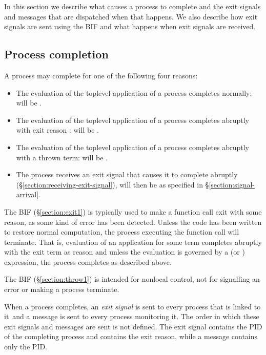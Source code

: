 In this section we describe what causes a process to complete and the exit signals and
messages that are dispatched when that happens.  We also describe how exit signals are
sent using the BIF  and what happens when exit signals are received.

\subsection{Process completion}

\label{section:process-completion}

A process may complete for one of the following four reasons:
\begin{itemize}
\item The evaluation of the toplevel application of a process completes normally:
 will be .
\item The evaluation of the toplevel application of a process completes abruptly
with exit reason :  will be .
\item The evaluation of the toplevel application of a process completes abruptly
with a thrown term:  will be .
\item The process receives an exit signal that causes it to complete abruptly
(\S\ref{section:receiving-exit-signal}),
 will then be as specified in \S\ref{section:signal-arrival}.
\end{itemize}

The BIF  (\S\ref{section:exit1}) is typically used to make a function
call exit with some reason, as some kind of error has been detected.  Unless the
code has been written to restore normal computation, the process executing the
function call will terminate.
That is, evaluation of an application  for some term  completes
abruptly with the exit term  as reason
and unless the evaluation is governed by a \ifNew{} (or ) \else {} \fi
expression, the process completes as described
above.

The BIF  (\S\ref{section:throw1}) is intended for nonlocal
control, not for signalling an error or making a process terminate.

\ifNew{}\fi
When a process completes, an \emph{exit signal} is sent to every process
that is linked to it\ifNew\ and a message is sent to every process
monitoring it\fi.
The order in which these exit signals \ifNew and messages \fi are sent
is not defined.
The exit signal contains the PID of the completing process and contains the exit
reason\ifNew, while a message contains only the PID\fi.
\ifNew{}\fi
{}

